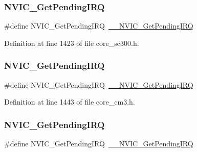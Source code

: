 \subsubsection{\texorpdfstring{N\+V\+I\+C\+\_\+\+Get\+Pending\+I\+RQ}{NVIC\_GetPendingIRQ}\hspace{0.1cm}{\footnotesize\ttfamily [7/13]}}
{\footnotesize\ttfamily \#define N\+V\+I\+C\+\_\+\+Get\+Pending\+I\+RQ~\hyperlink{group___c_m_s_i_s___core___n_v_i_c_functions_ga5a92ca5fa801ad7adb92be7257ab9694}{\+\_\+\+\_\+\+N\+V\+I\+C\+\_\+\+Get\+Pending\+I\+RQ}}



Definition at line 1423 of file core\+\_\+sc300.\+h.

\mbox{\label{group___c_m_s_i_s___core___n_v_i_c_functions_gac608957a239466e9e0cbc30aa64feb3b}} 
\subsubsection{\texorpdfstring{N\+V\+I\+C\+\_\+\+Get\+Pending\+I\+RQ}{NVIC\_GetPendingIRQ}\hspace{0.1cm}{\footnotesize\ttfamily [8/13]}}
{\footnotesize\ttfamily \#define N\+V\+I\+C\+\_\+\+Get\+Pending\+I\+RQ~\hyperlink{group___c_m_s_i_s___core___n_v_i_c_functions_ga5a92ca5fa801ad7adb92be7257ab9694}{\+\_\+\+\_\+\+N\+V\+I\+C\+\_\+\+Get\+Pending\+I\+RQ}}



Definition at line 1443 of file core\+\_\+cm3.\+h.

\mbox{\label{group___c_m_s_i_s___core___n_v_i_c_functions_gac608957a239466e9e0cbc30aa64feb3b}} 
\subsubsection{\texorpdfstring{N\+V\+I\+C\+\_\+\+Get\+Pending\+I\+RQ}{NVIC\_GetPendingIRQ}\hspace{0.1cm}{\footnotesize\ttfamily [9/13]}}
{\footnotesize\ttfamily \#define N\+V\+I\+C\+\_\+\+Get\+Pending\+I\+RQ~\hyperlink{group___c_m_s_i_s___core___n_v_i_c_functions_ga5a92ca5fa801ad7adb92be7257ab9694}{\+\_\+\+\_\+\+N\+V\+I\+C\+\_\+\+Get\+Pending\+I\+RQ}}



